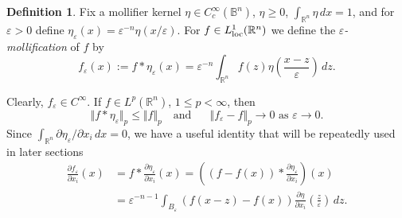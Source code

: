 \documentclass[intlimits,12pt,reqno]{amsart}
\newcommand{\bbbr}{\mathbb R}
\newcommand{\bbbb}{\mathbb B}
\newcommand{\eps}{\varepsilon}
\numberwithin{equation}{section}
\theoremstyle{definition}
\newtheorem{definition}[theorem]{Definition}
\begin{document}
\begin{definition}
\label{d2}
Fix a mollifier kernel $\eta\in C_c^\infty(\bbbb^n)$, $\eta\geq 0$, $\int_{\bbbr^n}\eta\, dx =1$, and for $\eps>0$ define
$\eta_\eps(x)=\eps^{-n}\eta(x/\eps)$. For $f\in L^1_{\rm loc}(\bbbr^n)$ we define the \emph{$\eps$-mollification} of $f$ by
$$
f_\eps(x):= f*\eta_\eps(x)= \eps^{-n} \int_{\bbbr^n} f(z)\eta\left(\frac{x-z}{\eps}\right)\, dz.
$$
\end{definition}
Clearly, $f_\eps\in C^\infty$. If $f\in L^p(\bbbr^n)$, $1\leq p<\infty$, then 
\begin{equation}
\label{eq3}
\Vert f*\eta_\eps\Vert_p\leq \Vert f\Vert_p
\quad
\text{and}
\quad
\text{ $\Vert f_\eps-f\Vert_p\to 0$ as $\eps\to 0$.}
\end{equation}
Since $\int_{\bbbr^n} \partial \eta_\eps/\partial x_i\, dx =0$, we have a useful identity that will be repeatedly used in later sections
\begin{equation}
\label{eq5}
\begin{split}
\frac{\partial f_\eps}{\partial x_i}(x)
&=
f*\frac{\partial\eta_\eps}{\partial x_i}(x)=\left((f-f(x))*\frac{\partial\eta_\eps}{\partial x_i}\right)(x)\\
&=
\eps^{-n-1}\int_{B_\eps}(f(x-z)-f(x))\frac{\partial\eta}{\partial x_i}\left(\frac{z}{\eps}\right)\, dz.
\end{split}
\end{equation}
\end{document}
